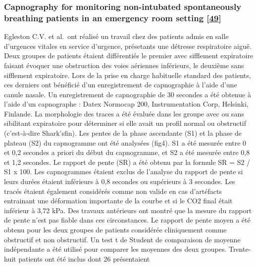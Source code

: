 \documentclass[12pt,]{article}
\begin{document}
\hypertarget{capnography-for-monitoring-non-intubated-spontaneously-breathing-patients-in-an-emergency-room-setting-egleston1997capnography}{%
\subsubsection{\texorpdfstring{Capnography for monitoring non-intubated
spontaneously breathing patients in an emergency room setting
{[}\protect\hyperlink{ref-egleston1997capnography}{49}{]}}{Capnography for monitoring non-intubated spontaneously breathing patients in an emergency room setting {[}49{]}}}\label{capnography-for-monitoring-non-intubated-spontaneously-breathing-patients-in-an-emergency-room-setting-egleston1997capnography}}

Egleston C.V. et al.~ont réalisé un travail chez des patients admis en
salle d'urgences vitales en service d'urgence, présetants une détresse
respiratoire aiguë. Deux groupes de patients étaient différentiés le
premier avec sifflement expiratoire faisant évoquer une obstruction des
voies aériennes inférieurs, le deuxième sans sifflement expiratoire.
Lors de la prise en charge habituelle standard des patients, ces
derniers ont bénéficié d'un enregistrement de capnographie à l'aide
d'une canule nasale. Un enregistrement de capnographie de 30 secondes a
été obtenue à l'aide d'un capnographe : Datex Normocap 200,
Instrumentation Corp, Helsinki, Finlande. La morphologie des traces a
été évaluée dans les groupe avec ou sans sibilitant expiratoire pour
déterminer si elle avait un profil normal ou obstructif (c'est-à-dire
Shark'sfin). Les pentes de la phase ascendante (S1) et la phase de
plateau (S2) du capnogramme ont été analysées (fig4). S1 a été mesurée
entre 0 et 0,2 secondes a priori du début du capnogramme, et S2 a été
mesurée entre 0,8 et 1,2 secondes. Le rapport de pente (SR) a été obtenu
par la formule SR = S2 / S1 x 100. Les capnogrammes étaient exclus de
l'analyse du rapport de pente si leurs durées étaient inférieurs à 0,8
secondes ou supérieurs à 3 secondes. Les tracés étaient également
considérés comme non valide en cas d'artéfacts entrainant une
déformation importante de la courbe et si le CO2 final était inférieur à
3,72 kPa. Des travaux antérieurs ont montré que la mesure du rapport de
pente n'est pas fiable dans ces circonstances. Le rapport de pente moyen
a été obtenu pour les deux groupes de patients considérée cliniquement
comme obstructif et non obstructif. Un test t de Student de comparaison
de moyenne indépendante a été utilisé pour comparer les moyennes des
deux groupes. Trente-huit patients ont été inclus dont 26 présentaient
\end{document}
